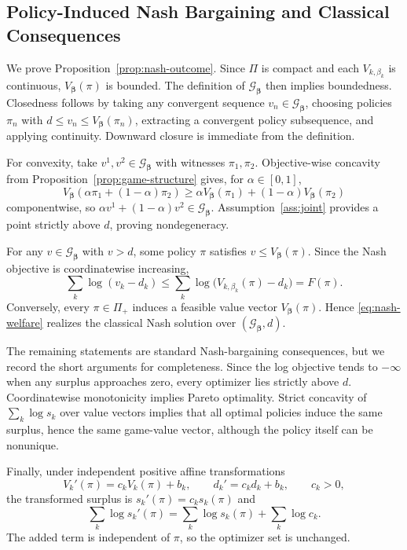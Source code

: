 \documentclass{article}
\theoremstyle{remark}
\theoremstyle{plain}
\newcommand{\G}{\mathcal{G}}
\begin{document}
\subsection{Policy-Induced Nash Bargaining and Classical Consequences}
\label{app:nash-properties}
We prove Proposition~\ref{prop:nash-outcome}. Since $\Pi$ is compact and each $V_{k,\beta_k}$ is continuous, $V_{\boldsymbol\beta}(\pi)$ is bounded. The definition of $\G_{\boldsymbol\beta}$ then implies boundedness. Closedness follows by taking any convergent sequence $v_n\in\G_{\boldsymbol\beta}$, choosing policies $\pi_n$ with $d\le v_n\le V_{\boldsymbol\beta}(\pi_n)$, extracting a convergent policy subsequence, and applying continuity. Downward closure is immediate from the definition.

For convexity, take $v^1,v^2\in\G_{\boldsymbol\beta}$ with witnesses $\pi_1,\pi_2$. Objective-wise concavity from Proposition~\ref{prop:game-structure} gives, for $\alpha\in[0,1]$,
\[
V_{\boldsymbol\beta}(\alpha\pi_1+(1-\alpha)\pi_2)
\ge
\alpha V_{\boldsymbol\beta}(\pi_1)+(1-\alpha)V_{\boldsymbol\beta}(\pi_2)
\]
componentwise, so $\alpha v^1+(1-\alpha)v^2\in\G_{\boldsymbol\beta}$. Assumption~\ref{ass:joint} provides a point strictly above $d$, proving nondegeneracy.

For any $v\in\G_{\boldsymbol\beta}$ with $v>d$, some policy $\pi$ satisfies $v\le V_{\boldsymbol\beta}(\pi)$. Since the Nash objective is coordinatewise increasing,
\[
\sum_k\log(v_k-d_k)
\le
\sum_k\log\bigl(V_{k,\beta_k}(\pi)-d_k\bigr)
=F(\pi).
\]
Conversely, every $\pi\in\Pi_+$ induces a feasible value vector $V_{\boldsymbol\beta}(\pi)$. Hence \eqref{eq:nash-welfare} realizes the classical Nash solution over $(\G_{\boldsymbol\beta},d)$.

The remaining statements are standard Nash-bargaining consequences, but we record the short arguments for completeness. Since the log objective tends to $-\infty$ when any surplus approaches zero, every optimizer lies strictly above $d$. Coordinatewise monotonicity implies Pareto optimality. Strict concavity of $\sum_k\log s_k$ over value vectors implies that all optimal policies induce the same surplus, hence the same game-value vector, although the policy itself can be nonunique.

Finally, under independent positive affine transformations
\[
V_k'(\pi)=c_kV_k(\pi)+b_k,
\qquad
d_k'=c_kd_k+b_k,
\qquad c_k>0,
\]
the transformed surplus is $s_k'(\pi)=c_ks_k(\pi)$ and
\[
\sum_k\log s_k'(\pi)
=
\sum_k\log s_k(\pi)+\sum_k\log c_k.
\]
The added term is independent of $\pi$, so the optimizer set is unchanged.
\end{document}
